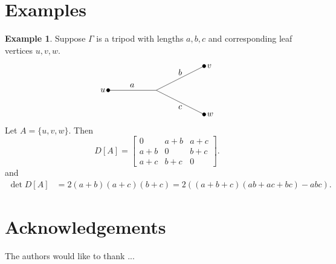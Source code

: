 \documentclass{amsart}
\theoremstyle{definition}
\newtheorem{eg}[thm]{Example}
\begin{document}
\section{Examples}
\begin{eg}
Suppose $\Gamma$ is a tripod with lengths $a,b,c$ and corresponding leaf vertices $u,v,w$.
\[
\begin{tikzpicture}
	\draw (0,0) -- (-2,0);
	\draw (2,1) -- (0,0) -- (2,-1);
	\filldraw[black] (-2,0) circle (2pt);
	\filldraw[black] (2,1) circle (2pt);
	\filldraw[black] (2,-1) circle (2pt);

	\node[above] at (-1,0) {$a$};
	\node[above] at (1,0.5) {$b$};
	\node[below] at (1,-0.5) {$c$};

	\node[left] at (-2,0) {$u$};
	\node[right] at (2,1) {$v$};
	\node[right] at (2,-1) {$w$};
\end{tikzpicture}
\]
Let $A = \{u,v,w\}$.
Then 
$$
D[A] = \begin{bmatrix}
0 & a + b & a + c \\
a + b & 0 & b + c \\
a + c & b + c & 0
\end{bmatrix}.
$$
and
\begin{align*}
\det D[A] &= 2(a+b)(a+c)(b+c) 
= 2\left( (a+b+c)(ab + ac + bc) - abc \right).
\end{align*}
\end{eg}


\section*{Acknowledgements}
The authors would like to thank ...


 

\end{document}
